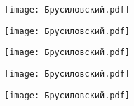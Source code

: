 \documentclass[main.tex]{subfiles}
\begin{document}
\begin{center}
\texttt{[image: Брусиловский.pdf]}
\end{center}

\begin{center}
\texttt{[image: Брусиловский.pdf]}
\end{center}

\begin{center}
\texttt{[image: Брусиловский.pdf]}
\end{center}

\begin{center}
\texttt{[image: Брусиловский.pdf]}
\end{center}

\begin{center}
\texttt{[image: Брусиловский.pdf]}
\end{center}
\end{document}
